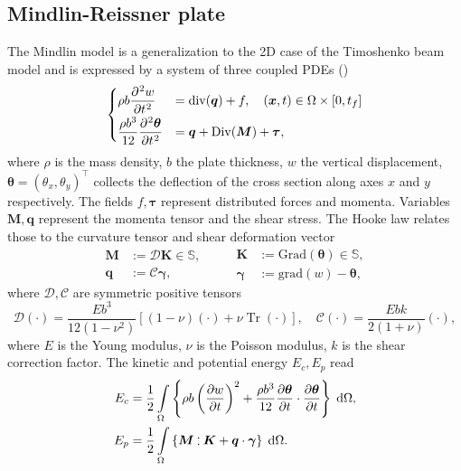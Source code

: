 \documentclass{ifacconf}
\DeclareMathOperator{\Tr}{Tr}
\def\onedot{$\mathsurround0pt\ldotp$}
\def\cddot{%
	\mathbin{\vcenter{\baselineskip.67ex
			\hbox{\onedot}\hbox{\onedot}}%
}}
\begin{document}
\subsection{Mindlin-Reissner plate}
The Mindlin model is a generalization to the 2D case of the Timoshenko beam model and is expressed by a system of three coupled PDEs (\cite{timoshenko1959theory}) 
\begin{equation}
\begin{cases}
\displaystyle \rho b \diffp[2]{w}{t} &= \mathrm{div}(\bm{q}) + f, \quad (\bm{x}, t) \in \Omega \times [0, t_f]  \vspace{1mm}\\
\displaystyle \frac{\rho b^3}{12} \diffp[2]{\bm \theta}{t} &= \bm{q} + \mathrm{Div}(\bm M) + \bm{\tau}, \\
\end{cases}
\end{equation}
where $\rho$ is the mass density, $b$ the plate thickness, $w$ the vertical displacement, $\bm \theta = (\theta_x, \theta_y)^\top$ collects the deflection of the cross section along axes $x$ and $y$ respectively. The fields $f, \bm{\tau}$ represent distributed forces and momenta. Variables $\bm{M}, \bm{q}$ represent the momenta tensor and the shear stress. The Hooke law relates those to the curvature tensor and shear deformation vector
\begin{equation*}
\begin{aligned}
\bm{M} &:= \mathcal{D} \bm{K} \in \mathbb{S}, \\ \bm{q} &:= \mathcal{C} \bm{\gamma},
\end{aligned} \qquad
\begin{aligned}
\bm{K} &:= \mathrm{Grad}(\bm{\theta}) \in \mathbb{S}, \\ \bm{\gamma} &:= \mathrm{grad}(w) - \bm{\theta}, 
\end{aligned}
\end{equation*}
where $\mathcal{D}, \mathcal{C}$ are symmetric positive tensors
\begin{equation}
\label{eq:bend_rig_tensor}
	\mathcal{D} (\cdot) = \frac{E b^3}{12 (1 - \nu^2)}[(1-\nu)(\cdot) + \nu \Tr(\cdot)], \quad \mathcal{C} (\cdot) = \frac{E b k }{2(1+\nu)}(\cdot),
\end{equation}
where $E$ is the Young modulus, $\nu$ is the Poisson modulus, $k$ is the shear correction factor.
 The kinetic and potential energy  $E_c, E_p$ read
\begin{equation}
\begin{aligned}
E_c &=  \frac{1}{2} \int_{\Omega} \left\{ \rho b \left(\diffp{w}{t} \right)^2 +  \frac{\rho b^3}{12} \diffp{\bm{\theta}}{t} \cdot \diffp{\bm{\theta}}{t}  \right\} \d\Omega, \\
E_p &= \frac{1}{2} \int_{\Omega} \left\{ \bm{M} \cddot \bm{K} + \bm{q} \cdot \bm{\gamma}  \right\}\d\Omega.
\end{aligned}
\end{equation} 
\end{document}
